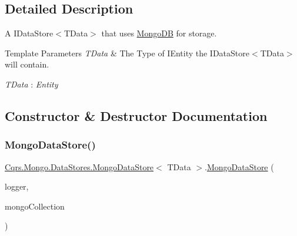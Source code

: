 \subsection{Detailed Description}
A I\+Data\+Store$<$\+T\+Data$>$ that uses \hyperlink{namespaceCqrs_1_1MongoDB}{Mongo\+DB} for storage. 


\begin{DoxyTemplParams}{Template Parameters}
{\em T\+Data} & The Type of I\+Entity the I\+Data\+Store$<$\+T\+Data$>$ will contain.\\
\hline
\end{DoxyTemplParams}
\begin{Desc}
\item[Type Constraints]\begin{description}
\item[{\em T\+Data} : {\em Entity}]\end{description}
\end{Desc}


\subsection{Constructor \& Destructor Documentation}
\mbox{\label{classCqrs_1_1Mongo_1_1DataStores_1_1MongoDataStore_a39f738d53074a548e6932bacdc4a4e3a_a39f738d53074a548e6932bacdc4a4e3a}} 
\subsubsection{\texorpdfstring{Mongo\+Data\+Store()}{MongoDataStore()}}
{\footnotesize\ttfamily \hyperlink{classCqrs_1_1Mongo_1_1DataStores_1_1MongoDataStore}{Cqrs.\+Mongo.\+Data\+Stores.\+Mongo\+Data\+Store}$<$ T\+Data $>$.\hyperlink{classCqrs_1_1Mongo_1_1DataStores_1_1MongoDataStore}{Mongo\+Data\+Store} (\begin{DoxyParamCaption}\item[{I\+Logger}]{logger,  }\item[{\hyperlink{classCqrs_1_1Mongo_1_1DataStores_1_1MongoDataStore_aa183a8ce44ec16d755f1e4fbe5ec4b10_aa183a8ce44ec16d755f1e4fbe5ec4b10}{Mongo\+Collection}$<$ T\+Data $>$}]{mongo\+Collection }\end{DoxyParamCaption})}



